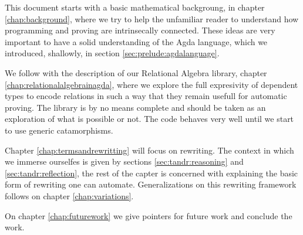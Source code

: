 This document starts with a basic mathematical backgroung, in chapter \ref{chap:background}, where we try to help the unfamiliar reader to understand
how programming and proving are intrinsecally connected. These ideas
are very important to have a solid understanding of the Agda language,
which we introduced, shallowly, in section \ref{sec:prelude:agdalanguage}.

We follow with the description of our Relational Algebra library, chapter \ref{chap:relationalalgebrainagda}, where we explore the full expresivity of 
dependent types to encode relations in such a way that they remain
usefull for automatic proving. The library is by no means complete and
should be taken as an exploration of what is possible or not. The code
behaves very well until we start to use generic catamorphisms.

Chapter \ref{chap:termsandrewritting} will focus on rewriting. The context
in which we immerse ourselfes is given by sections \ref{sec:tandr:reasoning} and
\ref{sec:tandr:reflection}, the rest of the capter is concerned with
explaining the basic form of rewriting one can automate. Generalizations
on this rewriting framework follows on chapter \ref{chap:variations}.

On chapter \ref{chap:futurework} we give pointers for future work and
conclude the work.

